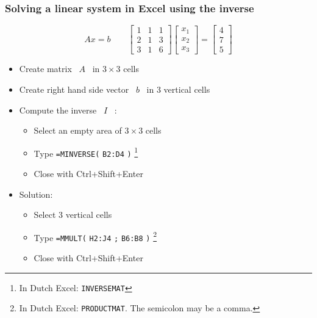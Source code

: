 \documentclass[11pt,table,final,xcolor={usenames,dvipsnames,table}]{beamer}
\begin{document}
\begin{frame}[fragile]
  \frametitle{Solving a linear system in Excel using the inverse}\vspace{-1em}
  \[
   Ax=b \qquad \begin{bmatrix}1&1&1\\2&1&3\\3&1&6\end{bmatrix}\begin{bmatrix}x_1\\x_2\\x_3\end{bmatrix}=\begin{bmatrix}4\\7\\5\end{bmatrix}
  \]\vspace{-1em}
  \begin{itemize}
    \item Create matrix \ $A$ \ in $3\times 3$ cells
    \item Create right hand side vector \ $b$ \ in 3 vertical cells\pause
    \item Compute the inverse \ $I$ \ :
    \begin{itemize}
      \item Select an empty area of $3 \times 3$ cells
      \item Type \lstinline$=MINVERSE($
      \lstinline$B2:D4$
      \lstinline$)$ \footnote{In Dutch Excel: \lstinline$INVERSEMAT$}
      \item Close with Ctrl+Shift+Enter
    \end{itemize}\pause
    \item Solution:
    \begin{itemize}
      \item Select 3 vertical cells
      \item Type \lstinline$=MMULT($
      \lstinline$H2:J4$
      \lstinline$;$
      \lstinline$B6:B8$
      \lstinline$)$ \footnote{In Dutch Excel: \lstinline$PRODUCTMAT$. The semicolon may be a comma.}
      \item Close with Ctrl+Shift+Enter
    \end{itemize}    
  \end{itemize}
\end{frame}
\end{document}
